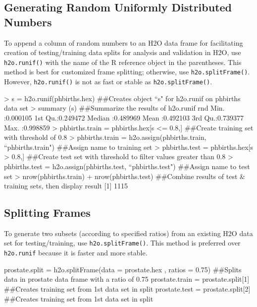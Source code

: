\documentclass[11pt]{article}
\begin{document}
\subsection{Generating Random Uniformly Distributed Numbers}

To append a column of random numbers to an H2O data frame for facilitating creation of testing/training data splits for analysis and validation in H2O, use {\texttt{h2o.runif()}} with the name of the R reference object in the parentheses. This method is best for customized frame splitting; otherwise, use {\texttt{h2o.splitFrame()}}. However, {\texttt{h2o.runif()}} is not as fast or stable as {\texttt{h2o.splitFrame()}}. 

\begin{spverbatim}
> s = h2o.runif(phbirths.hex) ##Creates object “s" for h2o.runif on phbirths data set
> summary (s)  ##Summarize the results of h2o.runif
 rnd               
 Min.   :0.000105  
 1st Qu.:0.249472  
 Median :0.489969  
 Mean   :0.492103  
 3rd Qu.:0.739377  
 Max.   :0.998859  
> phbirths.train = phbirths.hex[s <= 0.8,] ##Create training set with threshold of 0.8
> phbirths.train = h2o.assign(phbirths.train, “phbirths.train") ##Assign name to training set
> phbirths.test = phbirths.hex[s > 0.8,] ##Create test set with threshold to filter values greater than 0.8
> phbirths.test = h2o.assign(phbirths.test, “phbirths.test") ##Assign name to test set
> nrow(phbirths.train) + nrow(phbirths.test) ##Combine results of test & training sets, then display result
[1] 1115
\end{spverbatim}
 

\subsection{Splitting Frames}

To generate two subsets (according to specified ratios) from an existing H2O data set for testing/training, use {\texttt{h2o.splitFrame()}}.  This method is preferred over {\texttt{h2o.runif}} because it is faster and more stable. 

\begin{spverbatim}
prostate.split = h2o.splitFrame(data = prostate.hex , ratios = 0.75)
##Splits data in prostate data frame with a ratio of 0.75
prostate.train = prostate.split[1] 
##Creates training set from 1st data set in split
prostate.test = prostate.split[2]
##Creates training set from 1st data set in split
\end{spverbatim}
\end{document}
